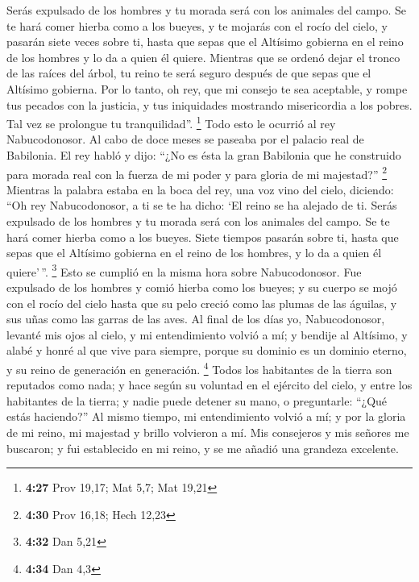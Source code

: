  Serás expulsado de los hombres y tu morada será con los
animales del campo. Se te hará comer hierba como a los bueyes, y te
mojarás con el rocío del cielo, y pasarán siete veces sobre ti, hasta
que sepas que el Altísimo gobierna en el reino de los hombres y lo da a
quien él quiere.  Mientras que se ordenó dejar el tronco
de las raíces del árbol, tu reino te será seguro después de que sepas
que el Altísimo gobierna.  Por lo tanto, oh rey, que mi
consejo te sea aceptable, y rompe tus pecados con la justicia, y tus
iniquidades mostrando misericordia a los pobres. Tal vez se prolongue tu
tranquilidad''. \footnote{\textbf{4:27} Prov 19,17; Mat 5,7; Mat 19,21}
 Todo esto le ocurrió al rey Nabucodonosor.
 Al cabo de doce meses se paseaba por el palacio real de
Babilonia.  El rey habló y dijo: ``¿No es ésta la gran
Babilonia que he construido para morada real con la fuerza de mi poder y
para gloria de mi majestad?'' \footnote{\textbf{4:30} Prov 16,18; Hech
  12,23}  Mientras la palabra estaba en la boca del rey,
una voz vino del cielo, diciendo: ``Oh rey Nabucodonosor, a ti se te ha
dicho: `El reino se ha alejado de ti.  Serás expulsado de
los hombres y tu morada será con los animales del campo. Se te hará
comer hierba como a los bueyes. Siete tiempos pasarán sobre ti, hasta
que sepas que el Altísimo gobierna en el reino de los hombres, y lo da a
quien él quiere'\,''. \footnote{\textbf{4:32} Dan 5,21} 
Esto se cumplió en la misma hora sobre Nabucodonosor. Fue expulsado de
los hombres y comió hierba como los bueyes; y su cuerpo se mojó con el
rocío del cielo hasta que su pelo creció como las plumas de las águilas,
y sus uñas como las garras de las aves.  Al final de los
días yo, Nabucodonosor, levanté mis ojos al cielo, y mi entendimiento
volvió a mí; y bendije al Altísimo, y alabé y honré al que vive para
siempre, porque su dominio es un dominio eterno, y su reino de
generación en generación. \footnote{\textbf{4:34} Dan 4,3}
 Todos los habitantes de la tierra son reputados como
nada; y hace según su voluntad en el ejército del cielo, y entre los
habitantes de la tierra; y nadie puede detener su mano, o preguntarle:
``¿Qué estás haciendo?''  Al mismo tiempo, mi
entendimiento volvió a mí; y por la gloria de mi reino, mi majestad y
brillo volvieron a mí. Mis consejeros y mis señores me buscaron; y fui
establecido en mi reino, y se me añadió una grandeza excelente.


